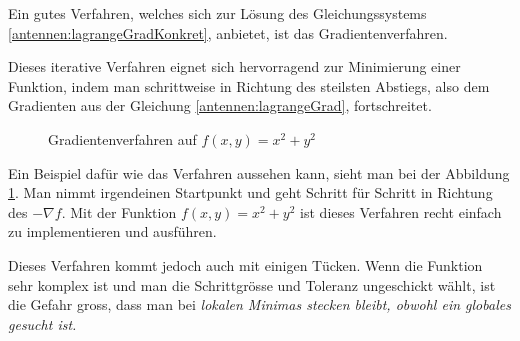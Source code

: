 Ein gutes Verfahren, welches sich zur Lösung des Gleichungssystems 
\eqref{antennen:lagrangeGradKonkret}, anbietet, ist das Gradientenverfahren.

Dieses iterative Verfahren eignet sich hervorragend zur Minimierung 
einer Funktion, indem man schrittweise in Richtung des steilsten Abstiegs,
also dem Gradienten aus der Gleichung \eqref{antennen:lagrangeGrad},
fortschreitet. 

\begin{figure}[htbp]
	\centering
	\caption{Gradientenverfahren auf $f(x,y)=x^2+y^2$}
	\label{antennen:gradverfahrenBSP}
\end{figure}

Ein Beispiel dafür wie das Verfahren aussehen kann, sieht man bei der 
Abbildung \ref{antennen:gradverfahrenBSP}. Man nimmt irgendeinen Startpunkt
und geht Schritt für Schritt in Richtung des $-\nabla f$. Mit der Funktion
$f(x,y)=x^2+y^2$ ist dieses Verfahren recht einfach zu implementieren und ausführen.

Dieses Verfahren kommt jedoch auch mit einigen Tücken. Wenn die Funktion sehr komplex ist
und man die Schrittgrösse und Toleranz ungeschickt wählt, ist die Gefahr gross, dass man 
bei \em lokalen \em Minimas stecken bleibt, obwohl ein \em globales \em gesucht ist.

